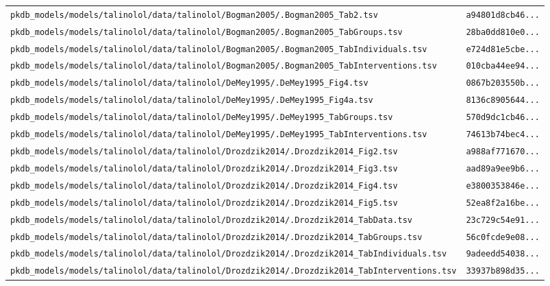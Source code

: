 \begin{longtable}{ll}
\texttt{pkdb\_models/models/talinolol/data/talinolol/Bogman2005/.Bogman2005\_Tab2.tsv} & \texttt{a94801d8cb46...} \\
\texttt{pkdb\_models/models/talinolol/data/talinolol/Bogman2005/.Bogman2005\_TabGroups.tsv} & \texttt{28ba0dd810e0...} \\
\texttt{pkdb\_models/models/talinolol/data/talinolol/Bogman2005/.Bogman2005\_TabIndividuals.tsv} & \texttt{e724d81e5cbe...} \\
\texttt{pkdb\_models/models/talinolol/data/talinolol/Bogman2005/.Bogman2005\_TabInterventions.tsv} & \texttt{010cba44ee94...} \\
\texttt{pkdb\_models/models/talinolol/data/talinolol/DeMey1995/.DeMey1995\_Fig4.tsv} & \texttt{0867b203550b...} \\
\texttt{pkdb\_models/models/talinolol/data/talinolol/DeMey1995/.DeMey1995\_Fig4a.tsv} & \texttt{8136c8905644...} \\
\texttt{pkdb\_models/models/talinolol/data/talinolol/DeMey1995/.DeMey1995\_TabGroups.tsv} & \texttt{570d9dc1cb46...} \\
\texttt{pkdb\_models/models/talinolol/data/talinolol/DeMey1995/.DeMey1995\_TabInterventions.tsv} & \texttt{74613b74bec4...} \\
\texttt{pkdb\_models/models/talinolol/data/talinolol/Drozdzik2014/.Drozdzik2014\_Fig2.tsv} & \texttt{a988af771670...} \\
\texttt{pkdb\_models/models/talinolol/data/talinolol/Drozdzik2014/.Drozdzik2014\_Fig3.tsv} & \texttt{aad89a9ee9b6...} \\
\texttt{pkdb\_models/models/talinolol/data/talinolol/Drozdzik2014/.Drozdzik2014\_Fig4.tsv} & \texttt{e3800353846e...} \\
\texttt{pkdb\_models/models/talinolol/data/talinolol/Drozdzik2014/.Drozdzik2014\_Fig5.tsv} & \texttt{52ea8f2a16be...} \\
\texttt{pkdb\_models/models/talinolol/data/talinolol/Drozdzik2014/.Drozdzik2014\_TabData.tsv} & \texttt{23c729c54e91...} \\
\texttt{pkdb\_models/models/talinolol/data/talinolol/Drozdzik2014/.Drozdzik2014\_TabGroups.tsv} & \texttt{56c0fcde9e08...} \\
\texttt{pkdb\_models/models/talinolol/data/talinolol/Drozdzik2014/.Drozdzik2014\_TabIndividuals.tsv} & \texttt{9adeedd54038...} \\
\texttt{pkdb\_models/models/talinolol/data/talinolol/Drozdzik2014/.Drozdzik2014\_TabInterventions.tsv} & \texttt{33937b898d35...} \\

\end{longtable}
